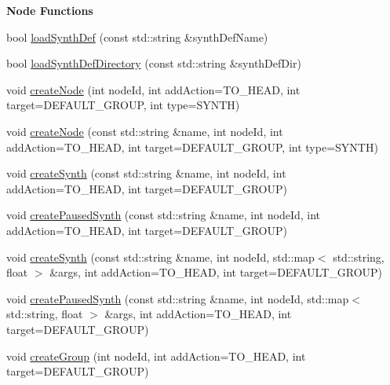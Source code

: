 \begin{Indent}{\bf Node Functions}\par
\begin{DoxyCompactItemize}
\item 
bool \hyperlink{classColliderPlusPlus_1_1Client__Server_afd313ab83f94df20ae0d3c197f7dd5db}{load\-Synth\-Def} (const std\-::string \&synth\-Def\-Name)
\item 
bool \hyperlink{classColliderPlusPlus_1_1Client__Server_a76dbfdb7b26d2ab6879b8c9604a9fbc5}{load\-Synth\-Def\-Directory} (const std\-::string \&synth\-Def\-Dir)
\item 
void \hyperlink{classColliderPlusPlus_1_1Client__Server_a4ef6cb6fa4898147fc84713e199d0d26}{create\-Node} (int node\-Id, int add\-Action=T\-O\-\_\-\-H\-E\-A\-D, int target=D\-E\-F\-A\-U\-L\-T\-\_\-\-G\-R\-O\-U\-P, int type=S\-Y\-N\-T\-H)
\item 
void \hyperlink{classColliderPlusPlus_1_1Client__Server_a3d80a52db50569ec6193b402e05e0b02}{create\-Node} (const std\-::string \&name, int node\-Id, int add\-Action=T\-O\-\_\-\-H\-E\-A\-D, int target=D\-E\-F\-A\-U\-L\-T\-\_\-\-G\-R\-O\-U\-P, int type=S\-Y\-N\-T\-H)
\item 
void \hyperlink{classColliderPlusPlus_1_1Client__Server_a1be332800c928ac8643ce2bc8dd5fa23}{create\-Synth} (const std\-::string \&name, int node\-Id, int add\-Action=T\-O\-\_\-\-H\-E\-A\-D, int target=D\-E\-F\-A\-U\-L\-T\-\_\-\-G\-R\-O\-U\-P)
\item 
void \hyperlink{classColliderPlusPlus_1_1Client__Server_a770e18f8f939c6f69853ef09800de0eb}{create\-Paused\-Synth} (const std\-::string \&name, int node\-Id, int add\-Action=T\-O\-\_\-\-H\-E\-A\-D, int target=D\-E\-F\-A\-U\-L\-T\-\_\-\-G\-R\-O\-U\-P)
\item 
void \hyperlink{classColliderPlusPlus_1_1Client__Server_a9f908dfa7a501ab2dcc26fa7181a0ca4}{create\-Synth} (const std\-::string \&name, int node\-Id, std\-::map$<$ std\-::string, float $>$ \&args, int add\-Action=T\-O\-\_\-\-H\-E\-A\-D, int target=D\-E\-F\-A\-U\-L\-T\-\_\-\-G\-R\-O\-U\-P)
\item 
void \hyperlink{classColliderPlusPlus_1_1Client__Server_a725281c3024cf35e1e1dd20667d39e4b}{create\-Paused\-Synth} (const std\-::string \&name, int node\-Id, std\-::map$<$ std\-::string, float $>$ \&args, int add\-Action=T\-O\-\_\-\-H\-E\-A\-D, int target=D\-E\-F\-A\-U\-L\-T\-\_\-\-G\-R\-O\-U\-P)
\item 
void \hyperlink{classColliderPlusPlus_1_1Client__Server_a4761f0556e0cb01f5ecbda6f567594ef}{create\-Group} (int node\-Id, int add\-Action=T\-O\-\_\-\-H\-E\-A\-D, int target=D\-E\-F\-A\-U\-L\-T\-\_\-\-G\-R\-O\-U\-P)

\end{DoxyCompactItemize}
\end{Indent}

